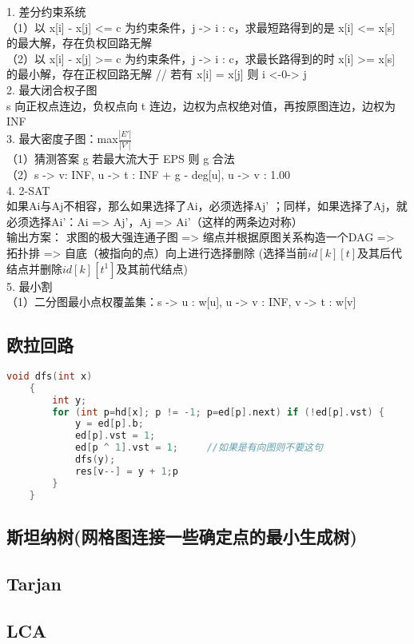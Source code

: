 \documentclass[landscape,a4paper]{article}
\begin{document}
\begin{spacing}{0.3}
\begin{multicols}{2}
		1. 差分约束系统\\
  （1）以 x[i] - x[j] <= c 为约束条件，j -> i : c，求最短路得到的是 x[i] <= x[s] 的最大解，存在负权回路无解\\
  （2）以 x[i] - x[j] >= c 为约束条件，j -> i : c，求最长路得到的时 x[i] >= x[s] 的最小解，存在正权回路无解
  // 若有 x[i] = x[j] 则 i <-0-> j\\
2. 最大闭合权子图\\
  s 向正权点连边，负权点向 t 连边，边权为点权绝对值，再按原图连边，边权为INF\\
3. 最大密度子图：max{$\frac{|E'|}{|V'|}$}\\
  （1）猜测答案 g 若最大流大于 EPS 则 g 合法\\
  （2）s -> v: INF, u -> t : INF + g - deg[u], u -> v : 1.00\\
4. 2-SAT\\
  如果Ai与Aj不相容，那么如果选择了Ai，必须选择Aj' ；同样，如果选择了Aj，就必须选择Ai'：Ai => Aj'，Aj => Ai'（这样的两条边对称）\\
  输出方案：  求图的极大强连通子图 => 缩点并根据原图关系构造一个DAG => 拓扑排 => 自底（被指向的点）向上进行选择删除
(选择当前$id[k][t]$及其后代结点并删除$id[k][t^1]$及其前代结点)\\
5. 最小割\\

（1）二分图最小点权覆盖集：s -> u : w[u], u -> v : INF, v -> t : w[v]\\


\subsection{欧拉回路}
\begin{lstlisting}[language=C++]
	void dfs(int x)
	{
    	int y;
   	 	for (int p=hd[x]; p != -1; p=ed[p].next) if (!ed[p].vst) {
       	 	y = ed[p].b;
        	ed[p].vst = 1;
        	ed[p ^ 1].vst = 1;     //如果是有向图则不要这句
        	dfs(y);
        	res[v--] = y + 1;p
    	}
	}
\end{lstlisting}
		  \subsection{斯坦纳树(网格图连接一些确定点的最小生成树)}
		
		\subsection{Tarjan}
		
		\subsection{LCA}
		

\end{multicols}
\end{spacing}
\end{document}
